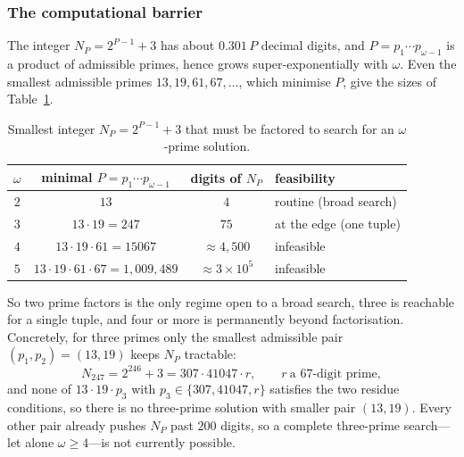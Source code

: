 \documentclass[a4paper]{article}
\theoremstyle{plain}
\theoremstyle{definition}
\theoremstyle{remark}
\begin{document}
\subsubsection{The computational barrier}
The integer $N_{P}=2^{P-1}+3$ has about $0.301\,P$ decimal digits, and $P=p_{1}\cdots
p_{\omega-1}$ is a product of admissible primes, hence grows super-exponentially with $\omega$.
Even the smallest admissible primes $13,19,61,67,\dots$, which minimise $P$, give the sizes of
Table~\ref{d1:tab:growth}.

\begin{table}[H]
\centering
\small
\begin{tabular}{cccl}
\toprule
$\omega$ & minimal $P=p_{1}\cdots p_{\omega-1}$ & digits of $N_{P}$ & feasibility \\
\midrule
$2$ & $13$ & $4$ & routine (broad search) \\
$3$ & $13\cdot 19=247$ & $75$ & at the edge (one tuple) \\
$4$ & $13\cdot 19\cdot 61=15067$ & $\approx 4{,}500$ & infeasible \\
$5$ & $13\cdot 19\cdot 61\cdot 67=1{,}009{,}489$ & $\approx 3\times 10^{5}$ & infeasible \\
\bottomrule
\end{tabular}
\caption{Smallest integer $N_{P}=2^{P-1}+3$ that must be factored to search for an
$\omega$-prime solution.}
\label{d1:tab:growth}
\end{table}

So two prime factors is the only regime open to a broad search, three is reachable for a single
tuple, and four or more is permanently beyond factorisation. Concretely, for three primes only
the smallest admissible pair $(p_{1},p_{2})=(13,19)$ keeps $N_{P}$ tractable:
\[
N_{247}=2^{246}+3=307\cdot 41047\cdot r,\qquad r\ \text{a 67-digit prime},
\]
and none of $13\cdot 19\cdot p_{3}$ with $p_{3}\in\{307,41047,r\}$ satisfies the two residue
conditions, so there is no three-prime solution with smaller pair $(13,19)$. Every other pair
already pushes $N_{P}$ past $200$ digits, so a complete three-prime search---let alone
$\omega\ge 4$---is not currently possible.
\end{document}
